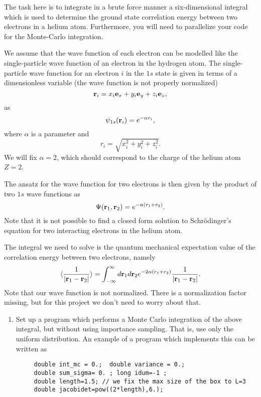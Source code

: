 \begin{prob}
The task here is to integrate in a brute force manner a six-dimensional integral which is used
to determine the ground state correlation energy between two electrons 
in a helium atom.  
Furthermore, you will need to parallelize your code for the Monte-Carlo integration.

We assume that the wave function of each electron can be modelled like the single-particle
wave function of an electron in the hydrogen atom. The single-particle wave function  for an electron $i$ in the 
$1s$ state 
is given in terms of a dimensionless variable    (the wave function is not properly normalized)
\[
   {\bf r}_i =  x_i {\bf e}_x + y_i {\bf e}_y +z_i {\bf e}_z ,
\]
as
\[
   \psi_{1s}({\bf r}_i)  =   e^{-\alpha r_i},
\]
where $\alpha$ is a parameter and 
\[
r_i = \sqrt{x_i^2+y_i^2+z_i^2}.
\]
We will fix $\alpha=2$, which should correspond to the charge of the helium atom $Z=2$. 

The ansatz for the wave function for two electrons is then given by the product of two
$1s$ wave functions as 
\[
   \Psi({\bf r}_1,{\bf r}_2)  =   e^{-\alpha (r_1+r_2)}.
\]
Note that it is not possible to find a closed form solution to Schr\"odinger's equation for 
two interacting electrons in the helium atom. 

The integral we need to solve is the quantum mechanical expectation value of the correlation
energy between two electrons, namely
\begin{equation}\label{eq:correlationenergy}
   \langle \frac{1}{|{\bf r}_1-{\bf r}_2|} \rangle =
   \int_{-\infty}^{\infty} d{\bf r}_1d{\bf r}_2  e^{-2\alpha (r_1+r_2)}\frac{1}{|{\bf r}_1-{\bf r}_2|}.
\end{equation}
Note that our wave function is not normalized. There is a normalization factor missing, but for this project
we don't need to worry about that.


\begin{enumerate}
\item Set up a program which performs a Monte Carlo integration of the above integral, but without using importance sampling. That is, use only the uniform distribution.
An example of a program which implements this can be written as
\begin{lstlisting}
     double int_mc = 0.;  double variance = 0.;
     double sum_sigma= 0. ; long idum=-1 ;  
     double length=1.5; // we fix the max size of the box to L=3
     double jacobidet=pow((2*length),6.);


\end{lstlisting}
\end{enumerate}
\end{prob}
